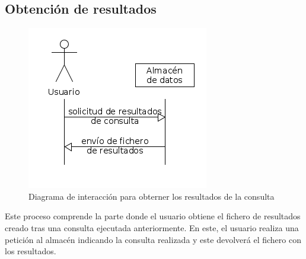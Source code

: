 \subsection{Obtención de resultados}
\begin{figure}[htp!]
\centering
\caption{Diagrama de interacción para obterner los resultados de la consulta}
\label{fig:pedirRes}
\includegraphics[scale=0.7]{diagramas/pedirRes}
\end{figure}

Este proceso comprende la parte donde el usuario obtiene el fichero de resultados creado tras una consulta ejecutada anteriormente. En este, el usuario realiza una petición al almacén indicando la consulta realizada y este devolverá el fichero con los resultados.
